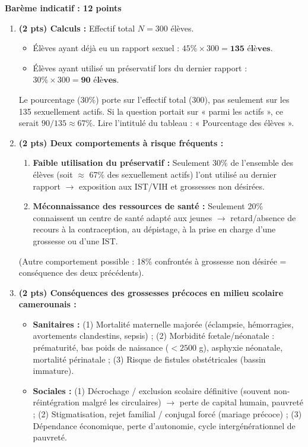 \documentclass[11pt]{article}
\begin{document}
\begin{corrige}
\textbf{Barème indicatif : 12 points}
\begin{enumerate}[itemsep=6pt]
\item \textbf{(2 pts) Calculs :}
Effectif total $N = 300$ élèves.
\begin{itemize}
\item Élèves ayant déjà eu un rapport sexuel : $45\% \times 300 = \textbf{135 élèves}$.
\item Élèves ayant utilisé un préservatif lors du dernier rapport : $30\% \times 300 = \textbf{90 élèves}$.
\end{itemize}
\begin{attention}[Attention]
Le pourcentage (30\%) porte sur l'effectif total (300), pas seulement sur les 135 sexuellement actifs. Si la question portait sur « parmi les actifs », ce serait $90/135 \approx 67\%$. Lire l'intitulé du tableau : « Pourcentage des élèves ».
\end{attention}
\item \textbf{(2 pts) Deux comportements à risque fréquents :}
\begin{enumerate}
\item \textbf{Faible utilisation du préservatif :} Seulement 30\% de l'ensemble des élèves (soit $\approx$ 67\% des sexuellement actifs) l'ont utilisé au dernier rapport $\rightarrow$ exposition aux IST/VIH et grossesses non désirées.
\item \textbf{Méconnaissance des ressources de santé :} Seulement 20\% connaissent un centre de santé adapté aux jeunes $\rightarrow$ retard/absence de recours à la contraception, au dépistage, à la prise en charge d'une grossesse ou d'une IST.
\end{enumerate}
(Autre comportement possible : 18\% confrontés à grossesse non désirée = conséquence des deux précédents).
\item \textbf{(2 pts) Conséquences des grossesses précoces en milieu scolaire camerounais :}
\begin{itemize}
\item \textbf{Sanitaires :} (1) Mortalité maternelle majorée (éclampsie, hémorragies, avortements clandestins, sepsis) ; (2) Morbidité fœtale/néonatale : prématurité, bas poids de naissance ($< 2500$ g), asphyxie néonatale, mortalité périnatale ; (3) Risque de fistules obstétricales (bassin immature).
\item \textbf{Sociales :} (1) Décrochage / exclusion scolaire définitive (souvent non-réintégration malgré les circulaires) $\rightarrow$ perte de capital humain, pauvreté ; (2) Stigmatisation, rejet familial / conjugal forcé (mariage précoce) ; (3) Dépendance économique, perte d'autonomie, cycle intergénérationnel de pauvreté.

\end{itemize}
\end{enumerate}
\end{corrige}
\end{document}

